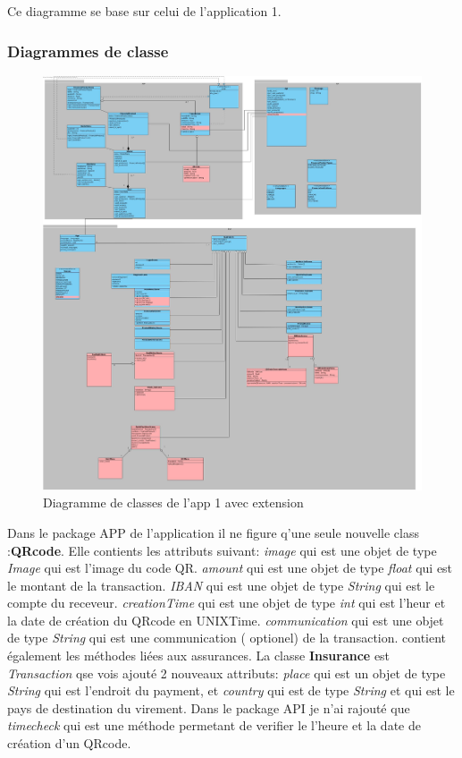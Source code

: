 \documentclass[../rapport.tex]{subfiles}
\begin{document}
	    Ce diagramme se base sur celui de l'application 1.

\newpage
		\subsubsection{Diagrammes de classe}
				\begin{figure}[h]
						\centering\includegraphics[scale=0.15]{ressources/photos_diagrammes/extensionChristian/classapp1/classapp1.jpg}
						\caption{Diagramme de classes de l'app 1 avec extension}
				\end{figure}
		Dans le package APP de l'application il ne figure q'une seule nouvelle class :\textbf{QRcode}.
        Elle contients les attributs suivant: 
		\textit{image} qui est une objet de type \textit{Image} qui est l'image du code QR. 
        \textit{amount} qui est une objet de type \textit{float} qui est le montant de la transaction.
        \textit{IBAN} qui est une objet de type \textit{String} qui est le compte du receveur.
        \textit{creationTime} qui est une objet de type \textit{int} qui est l'heur et la date de création du QRcode en UNIXTime.
        \textit{communication} qui est une objet de type \textit{String} qui est une communication ( optionel) de la transaction.
		contient également les méthodes liées aux assurances. La classe \textbf{Insurance} est
		\textit{Transaction} qse vois ajouté 2 nouveaux attributs: 
        \textit{place} qui est un objet de type \textit{String} qui est l'endroit du payment, et 
        \textit{country} qui est de type \textit{String} et qui est le pays de destination du virement.
        \bigskip
        Dans le package API je n'ai rajouté que \textit{timecheck} qui est une méthode permetant de verifier le l'heure et la date
        de création d'un QRcode.    
\end{document}
